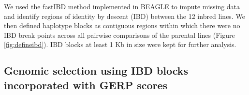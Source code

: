 \documentclass[twoside, twocolumn, letterpaper]{article}
\newcommand{\yang}[1]{\todo[size=\scriptsize, color=cyan]{#1}}
\begin{document}
We used the fastIBD method implemented in BEAGLE \citep{Browning2009} to impute missing data and identify regions of identity by descent (IBD) between the 12 inbred lines. 
We then defined haplotype blocks as contiguous regions within which there were no IBD break points across all pairwise comparisons of the parental lines (Figure \ref{fig:defineibd}). IBD blocks at least 1 Kb in size were kept for further analysis. 




\subsection*{Genomic selection using IBD blocks incorporated with GERP scores}
\end{document}
